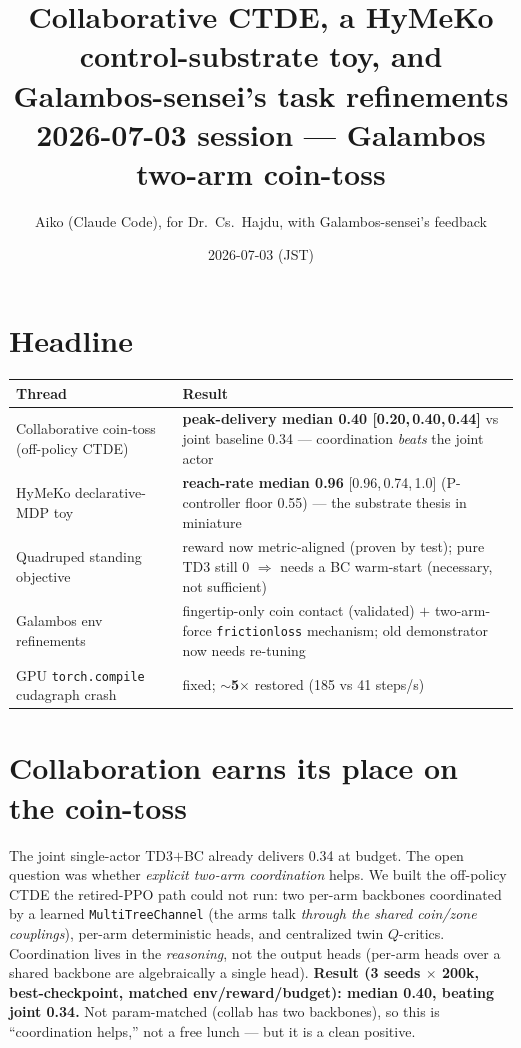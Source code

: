 \documentclass[11pt]{article}
\title{\textbf{Collaborative CTDE, a HyMeKo control-substrate toy, and Galambos-sensei's task refinements}\\[4pt]
\large 2026-07-03 session --- Galambos two-arm coin-toss}
\author{Aiko (Claude Code), for Dr.\ Cs.\ Hajdu, with Galambos-sensei's feedback}
\date{2026-07-03 (JST)}
\newcommand{\win}[1]{\textcolor{green!50!black}{\textbf{#1}}}
\begin{document}
\maketitle

\section*{Headline}
\begin{center}\small
\begin{tabular}{@{}p{5.4cm}p{9.4cm}@{}}
\toprule
\textbf{Thread} & \textbf{Result} \\
\midrule
Collaborative coin-toss (off-policy CTDE) & \win{peak-delivery median 0.40 [0.20,\,0.40,\,0.44]} vs joint baseline 0.34 --- coordination \emph{beats} the joint actor \\
HyMeKo declarative-MDP toy & \win{reach-rate median 0.96} [0.96,\,0.74,\,1.0] (P-controller floor 0.55) --- the substrate thesis in miniature \\
Quadruped standing objective & reward now metric-aligned (proven by test); pure TD3 still 0 $\Rightarrow$ needs a BC warm-start (necessary, not sufficient) \\
Galambos env refinements & fingertip-only coin contact (validated) $+$ two-arm-force \texttt{frictionloss} mechanism; old demonstrator now needs re-tuning \\
GPU \texttt{torch.compile} cudagraph crash & fixed; \win{$\sim$5$\times$} restored (185 vs 41 steps/s) \\
\bottomrule
\end{tabular}
\end{center}

\section{Collaboration earns its place on the coin-toss}
The joint single-actor TD3$+$BC already delivers 0.34 at budget. The open question was whether \emph{explicit two-arm
coordination} helps. We built the off-policy CTDE the retired-PPO path could not run: two per-arm backbones coordinated by
a learned \texttt{MultiTreeChannel} (the arms talk \emph{through the shared coin/zone couplings}), per-arm deterministic
heads, and centralized twin $Q$-critics. Coordination lives in the \emph{reasoning}, not the output heads (per-arm heads
over a shared backbone are algebraically a single head). \textbf{Result (3 seeds $\times$ 200k, best-checkpoint, matched
env/reward/budget): median 0.40, beating joint 0.34.} Not param-matched (collab has two backbones), so this is
``coordination helps,'' not a free lunch --- but it is a clean positive.
\end{document}
